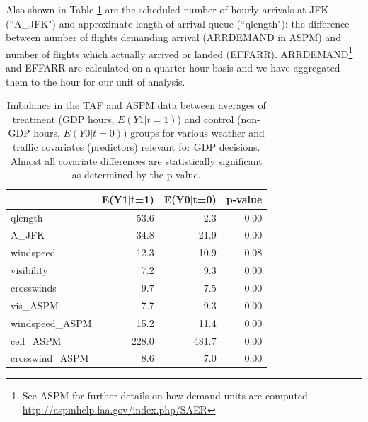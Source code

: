 \documentclass[conference]{IEEEtran}
\begin{document}
Also shown in Table \ref{tab:imbalance} are the scheduled number of hourly arrivals at JFK (``A\_JFK") and approximate length of arrival queue (``qlength"): the difference between number of flights demanding arrival (ARRDEMAND in ASPM) and number of flights which actually arrived or landed (EFFARR).  ARRDEMAND\footnote{See ASPM for further details on how demand units are computed \url{ http://aspmhelp.faa.gov/index.php/SAER}} and EFFARR are calculated on a quarter hour basis and we have aggregated them to the hour for our unit of analysis.  

\begin{table}[ht]
\centering
\begin{tabular}{lrrr}
  \hline
 & E(Y1$|$t=1) & E(Y0$|$t=0) & p-value \\ 
  \hline
qlength & 53.6 & 2.3 & 0.00 \\ 
  A\_JFK & 34.8 & 21.9 & 0.00 \\ 
  windspeed & 12.3 & 10.9 & 0.08 \\ 
  visibility & 7.2 & 9.3 & 0.00 \\ 
  crosswinds & 9.7 & 7.5 & 0.00 \\ 
  vis\_ASPM & 7.7 & 9.3 & 0.00 \\ 
  windspeed\_ASPM & 15.2 & 11.4 & 0.00 \\ 
  ceil\_ASPM & 228.0 & 481.7 & 0.00 \\ 
  crosswind\_ASPM & 8.6 & 7.0 & 0.00 \\ 
   \hline
\end{tabular}
\caption{Imbalance in the TAF and ASPM data between averages of treatment (GDP hours, $E(Y1|t=1)$)  and control (non-GDP hours, $E(Y0|t=0)$) groups for various weather and traffic covariates (predictors) relevant for GDP decisions.  Almost all covariate differences are statistically significant as determined by the p-value.} 
\label{tab:imbalance}
\end{table}
\end{document}
